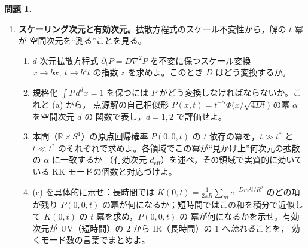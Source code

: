 \documentclass[dvipdfmx, uplatex]{jsarticle}
\theoremstyle{definition}
\newtheorem*{prob}{問題}
\begin{document}
\begin{prob}
\begin{enumerate}[start=7]
\item \textbf{スケーリング次元と有効次元。}拡散方程式のスケール不変性から，解の $t$ 冪が
空間次元を``測る''ことを見る。
\begin{enumerate}
\item $d$ 次元拡散方程式 $\partial_t P=D\nabla^2P$ を不変に保つスケール変換
$x\to bx,\ t\to b^z t$ の指数 $z$ を求めよ。このとき $D$ はどう変換するか。
\item 規格化 $\int P\,d^dx=1$ を保つには $P$ がどう変換しなければならないか。これと (a) から，
点源解の自己相似形 $P(x,t)=t^{-\alpha}\Phi\!\bigl(x/\sqrt{4Dt}\bigr)$ の冪 $\alpha$ を空間次元 $d$ の
関数で表し，$d=1,2$ で評価せよ。
\item 本問（$\mathbb{R}\times S^1$）の原点回帰確率 $P(0,0,t)$ の $t$ 依存の冪を，$t\gg t^\ast$ と
$t\ll t^\ast$ のそれぞれで求めよ。各領域でこの冪が``見かけ上''何次元の拡散の $\alpha$ に一致するか
（有効次元 $d_{\mathrm{eff}}$）を述べ，その領域で実質的に効いている KK モードの個数と対応づけよ。
\item (c) を具体的に示せ：長時間では $K(0,t)=\frac{1}{2\pi R}\sum_m e^{-Dm^2t/R^2}$ のどの項が残り
$P(0,0,t)$ の冪が何になるか；短時間ではこの和を積分で近似して $K(0,t)$ の $t$ 冪を求め，$P(0,0,t)$ の
冪が何になるかを示せ。有効次元が UV（短時間）の $2$ から IR（長時間）の $1$ へ\emph{流れる}ことを，
効くモード数の言葉でまとめよ。
\end{enumerate}
\end{enumerate}
\end{prob}
\end{document}
